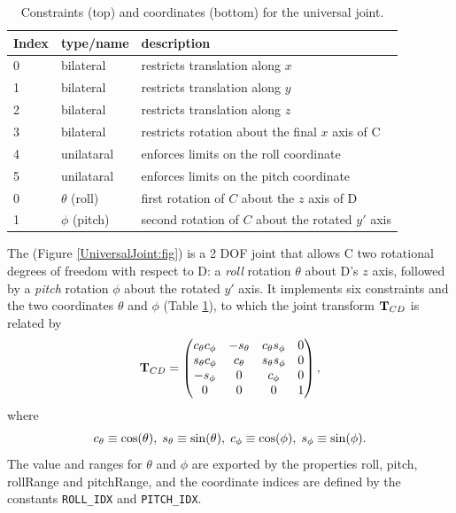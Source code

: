 \begin{table}[h]
\centering
\begin{tabular}{|l|l|l|}
\hline
Index & type/name & description \\
\hline
0 & bilateral & restricts translation along $x$ \\
1 & bilateral & restricts translation along $y$ \\
2 & bilateral & restricts translation along $z$ \\
3 & bilateral & restricts rotation about the final $x$ axis of C \\
4 & unilataral & enforces limits on the roll coordinate \\
5 & unilataral & enforces limits on the pitch coordinate \\
\hline
\hline
0 & $\theta$ (roll) & first rotation of $C$ about the $z$ axis of D \\
1 & $\phi$ (pitch) & second rotation of $C$ about the rotated $y'$ axis \\
\hline
\end{tabular}
\caption{Constraints (top) and coordinates (bottom) for the universal joint.}
\label{UniversalConstraints:tbl}
\end{table}

The  
(Figure \ref{UniversalJoint:fig}) is a 2 DOF joint
that allows C two rotational degrees of freedom with respect to D: a
{\it roll} rotation $\theta$ about D's $z$ axis, followed by a {\it
pitch} rotation $\phi$ about the rotated $y'$ axis. It implements six
constraints and the two coordinates $\theta$ and $\phi$
(Table \ref{UniversalConstraints:tbl}), to which the joint transform
${\bf T}_{CD}$ is related by
%
\begin{equation*}
{\bf T}_{CD} = \left(\begin{matrix}
c_\theta c_\phi & -s_\theta & c_\theta s_\phi & 0 \\
s_\theta c_\phi & c_\theta & s_\theta s_\phi & 0 \\
-s_\phi & 0 & c_\phi & 0 \\
0 & 0 & 0 & 1 
\end{matrix}\right),
\end{equation*}
where 
%
\begin{equation*}
c_\theta \equiv \cos(\theta),\; 
s_\theta \equiv \sin(\theta),\;
c_\phi \equiv \cos(\phi),\;
s_\phi \equiv \sin(\phi).
\end{equation*}
%
The value and ranges for $\theta$ and $\phi$ are exported by the
properties {\sf roll}, {\sf pitch}, {\sf rollRange} and {\sf
pitchRange}, and the coordinate indices are defined by the constants
{\tt ROLL\_IDX} and {\tt PITCH\_IDX}.  


